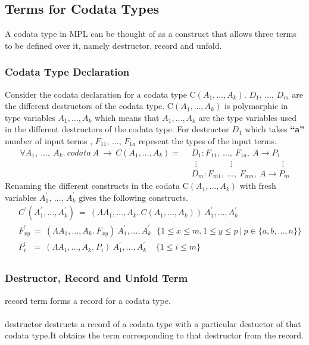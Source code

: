 \documentclass[11pt]{article}
\begin{document}
\subsection {Terms for Codata Types}
A codata type in MPL can be thought of as a construct that allows three terms to be defined over it, namely destructor, record and unfold.

\subsubsection {Codata Type Declaration}
Consider the codata declaration for a codata type C$(A_1,\ldots,A_k)$. $D_1$, $\ldots$, $D_m$ are the different destructors of the codata type. C$(A_1,\ldots,A_k)$  is polymorphic in type variables $A_1,\ldots,A_k$ which means that $A_1,
\ldots,A_k$ are the type variables used in the different destructors of the codata type. For destructor $D_1$ which takes {\bf ``a''} number of input terms , $F_{11}$, $\ldots$, $F_{1a}$ repesent the types of the input terms.
\begin{align*} 
\forall A_1,~ \ldots,~A_k.~codata~ A ~\to~ C (A_1,\ldots,A_k) =
 & ~~ D_1 : F_{11},~ \ldots, ~ F_{1a},~A \to P_1 \\
 & ~~~~ \vdots \qquad\qquad \vdots \qquad\qquad\qquad \vdots \\ 
 & ~~ D_m : F_{m1} ,~ \ldots, ~ F_{mn},~A \to P_m
\end{align*}
Renaming the different constructs in the codata C$(A_1,\ldots,A_k)$ with fresh variables $A_1^{\prime}$, $\ldots$, $A_k^{\prime}$ gives the following constructs. 
\begin{align*}
 & ~~ C^{\prime}(A_1^\prime,\ldots,A_k^\prime)~ = ~(\Lambda A_1,\ldots,A_k.~ C (A_1,\ldots,A_k))~A_1^{\prime},\ldots,A_k^{\prime}\\ 
 & ~~ F_{xy}^\prime ~ =~ (\Lambda A_1,\ldots,A_k.~F_{xy})~A_1^{\prime},\ldots,A_k^{\prime} 
 ~~~  \{1 \leq x \leq m,1 \leq y \leq p ~|~ p \in \{a,b,\ldots,n\} \} \\
 & ~~ P_{i}^\prime ~~~=~ (\Lambda A_1,\ldots,A_k.~ P_i)~A_1^{\prime},\ldots,A_k^{\prime} 
  ~~~~~ \{ 1 \leq i \leq m \} \\
 \end{align*}
\subsubsection {Destructor, Record and Unfold Term} 
{\sf record } term forms a record for a codata type. 
~~\\~~\\
{\sf destructor} destructs a record of a codata type with a particular destuctor of that codata type.It obtains the term corresponding to that destructor from the record.
\end{document}
